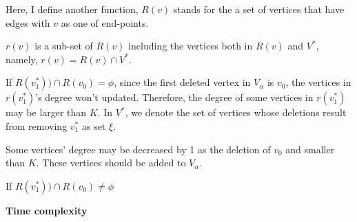 Here, I define another function, $R(v)$ stands for the a set of vertices that have edges with $v$ as one of end-points.

$r(v)$ is a sub-set of $R(v)$ including the vertices both in $R(v)$ and $V^*$, namely, $r(v)= R(v) \cap V^*$.

If $R(v_1^*)) \cap  R(v_0) = \phi $,  since the first deleted vertex in $V_\alpha$ is $v_0$, the vertices in $r(v_1^*)$'s degree won't updated. Therefore, the degree of some vertices in $r(v_1^*)$ may be larger than $K$. In $V^*$, we denote the set of  vertices whose deletions result from removing $v_1^*$ as set $\xi$. 

Some vertices' degree may be decreased by 1 as the deletion of $v_0$ and smaller than $K$. These vertices should be added to $V_\alpha$. 
 
If $R(v_1^*)) \cap  R(v_0) \neq \phi $
 
 

\vspace{5mm}
\noindent
\textbf{Time complexity}
